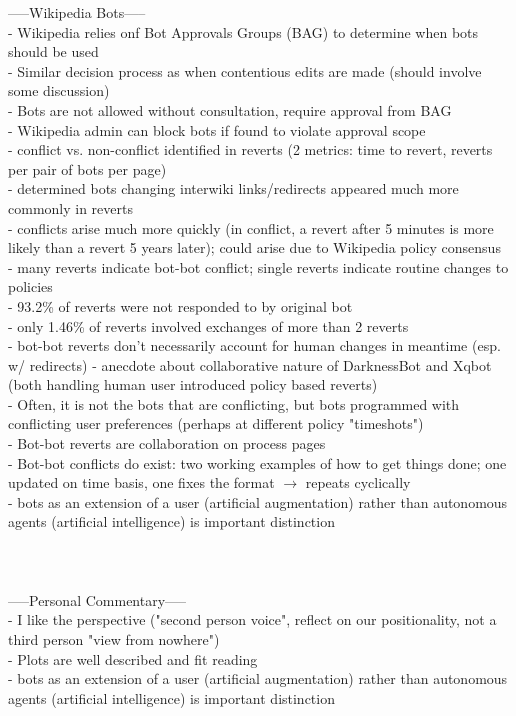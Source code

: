 \documentclass{report}
\begin{document}
-----Wikipedia Bots-----\\
- Wikipedia relies onf Bot Approvals Groups (BAG) to determine when bots should be used \\
- Similar decision process as when contentious edits are made (should involve some discussion) \\
- Bots are not allowed without consultation, require approval from BAG \\
- Wikipedia admin can block bots if found to violate approval scope \\
- conflict vs. non-conflict identified in reverts (2 metrics: time to revert, reverts per pair of bots per page) \\
- determined bots changing interwiki links/redirects appeared much more commonly in reverts \\
- conflicts arise much more quickly (in conflict, a revert after 5 minutes is more likely than a revert 5 years later); could arise due to Wikipedia policy consensus \\
- many reverts indicate bot-bot conflict; single reverts indicate routine changes to policies \\
- 93.2\% of reverts were not responded to by original bot \\
- only 1.46\% of reverts involved exchanges of more than 2 reverts \\
- bot-bot reverts don't necessarily account for human changes in meantime (esp. w/ redirects)
- anecdote about collaborative nature of DarknessBot and Xqbot (both handling human user introduced policy based reverts) \\
- Often, it is not the bots that are conflicting, but bots programmed with conflicting user preferences (perhaps at different policy "timeshots") \\
- Bot-bot reverts are collaboration on process pages \\
- Bot-bot conflicts do exist: two working examples of how to get things done; one updated on time basis, one fixes the format $\rightarrow$ repeats cyclically \\
- bots as an extension of a user (artificial augmentation) rather than autonomous agents (artificial intelligence) is important distinction \\

\-\\
\-\\
\-\\
-----Personal Commentary-----\\
- I like the perspective ("second person voice", reflect on our positionality, not a third person "view from nowhere") \\
- Plots are well described and fit reading \\
- bots as an extension of a user (artificial augmentation) rather than autonomous agents (artificial intelligence) is important distinction \\
\end{document}
